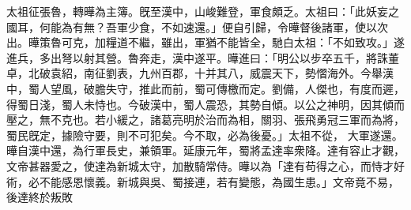 \begin{pinyinscope}
 
太祖征張魯，轉曄為主簿。旣至漢中，山峻難登，軍食頗乏。太祖曰：「此妖妄之國耳，何能為有無？吾軍少食，不如速還。」便自引歸，令曄督後諸軍，使以次出。曄策魯可克，加糧道不繼，雖出，軍猶不能皆全，馳白太祖：「不如致攻。」遂進兵，多出弩以射其營。魯奔走，漢中遂平。曄進曰：「明公以步卒五千，將誅董卓，北破袁紹，南征劉表，九州百郡，十并其八，威震天下，勢慴海外。今舉漢中，蜀人望風，破膽失守，推此而前，蜀可傳檄而定。劉備，人傑也，有度而遲，得蜀日淺，蜀人未恃也。今破漢中，蜀人震恐，其勢自傾。以公之神明，因其傾而壓之，無不克也。若小緩之，諸葛亮明於治而為相，關羽、張飛勇冠三軍而為將，蜀民旣定，據險守要，則不可犯矣。今不取，必為後憂。」太祖不從，
 大軍遂還。曄自漢中還，為行軍長史，兼領軍。延康元年，蜀將孟達率衆降。達有容止才觀，文帝甚器愛之，使達為新城太守，加散騎常侍。曄以為「達有苟得之心，而恃才好術，必不能感恩懷義。新城與吳、蜀接連，若有變態，為國生患。」文帝竟不易，後達終於叛敗
 

\end{pinyinscope}
